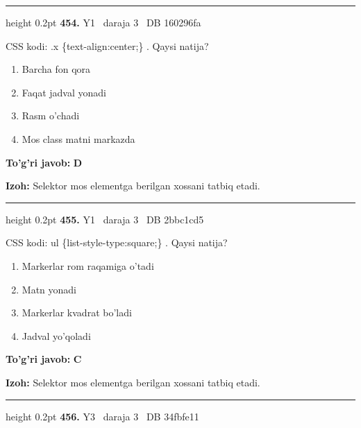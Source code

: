 \documentclass[10pt,a4paper,oneside]{article}
\begin{document}
\vspace{2mm}\hrule height 0.2pt \vspace{4mm}
\hypertarget{q454}{\textbf{\color{ink}454.}}  {\color{muted}\scriptsize Y1 \textbullet\ daraja 3 \textbullet\ DB 160296fa}
\par
CSS kodi: .x \{text-align:center;\} . Qaysi natija?
\begin{enumerate}[label=\Alph*),leftmargin=9mm]
\item Barcha fon qora
\item Faqat jadval yonadi
\item Rasm o'chadi
\item Mos class matni markazda
\end{enumerate}
\begin{tcolorbox}[enhanced,breakable,colback=teal!4,colframe=teal!45!black,boxrule=0.45pt,arc=1.2mm,left=2.8mm,right=2.8mm,top=2mm,bottom=2mm,before skip=2mm,after skip=2mm]
\textbf{\color{teal}To'g'ri javob:} \textbf{D}
\par\smallskip
\textbf{Izoh:} Selektor mos elementga berilgan xossani tatbiq etadi.
\end{tcolorbox}
\vspace{2mm}\hrule height 0.2pt \vspace{4mm}
\hypertarget{q455}{\textbf{\color{ink}455.}}  {\color{muted}\scriptsize Y1 \textbullet\ daraja 3 \textbullet\ DB 2bbc1cd5}
\par
CSS kodi: ul \{list-style-type:square;\} . Qaysi natija?
\begin{enumerate}[label=\Alph*),leftmargin=9mm]
\item Markerlar rom raqamiga o'tadi
\item Matn yonadi
\item Markerlar kvadrat bo'ladi
\item Jadval yo'qoladi
\end{enumerate}
\begin{tcolorbox}[enhanced,breakable,colback=teal!4,colframe=teal!45!black,boxrule=0.45pt,arc=1.2mm,left=2.8mm,right=2.8mm,top=2mm,bottom=2mm,before skip=2mm,after skip=2mm]
\textbf{\color{teal}To'g'ri javob:} \textbf{C}
\par\smallskip
\textbf{Izoh:} Selektor mos elementga berilgan xossani tatbiq etadi.
\end{tcolorbox}
\vspace{2mm}\hrule height 0.2pt \vspace{4mm}
\hypertarget{q456}{\textbf{\color{ink}456.}}  {\color{muted}\scriptsize Y3 \textbullet\ daraja 3 \textbullet\ DB 34fbfe11}
\end{document}
